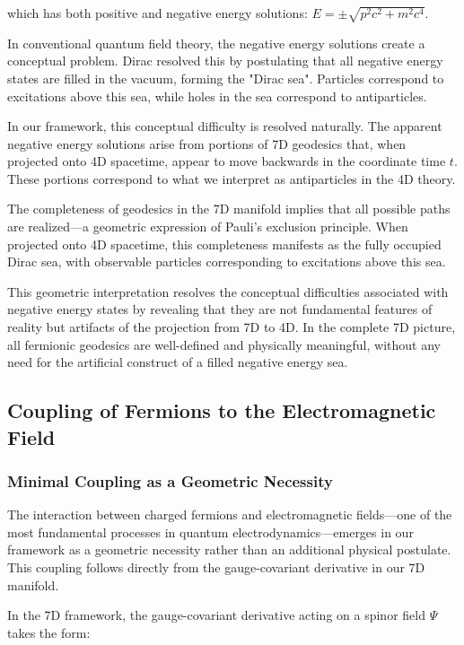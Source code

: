 \documentclass{article}
\begin{document}
which has both positive and negative energy solutions: $E = \pm\sqrt{p^2c^2 + m^2c^4}$.

In conventional quantum field theory, the negative energy solutions create a conceptual problem. Dirac resolved this by postulating that all negative energy states are filled in the vacuum, forming the "Dirac sea". Particles correspond to excitations above this sea, while holes in the sea correspond to antiparticles.

In our framework, this conceptual difficulty is resolved naturally. The apparent negative energy solutions arise from portions of 7D geodesics that, when projected onto 4D spacetime, appear to move backwards in the coordinate time $t$. These portions correspond to what we interpret as antiparticles in the 4D theory.

The completeness of geodesics in the 7D manifold implies that all possible paths are realized—a geometric expression of Pauli's exclusion principle. When projected onto 4D spacetime, this completeness manifests as the fully occupied Dirac sea, with observable particles corresponding to excitations above this sea.

This geometric interpretation resolves the conceptual difficulties associated with negative energy states by revealing that they are not fundamental features of reality but artifacts of the projection from 7D to 4D. In the complete 7D picture, all fermionic geodesics are well-defined and physically meaningful, without any need for the artificial construct of a filled negative energy sea.

\subsection{Coupling of Fermions to the Electromagnetic Field}

\subsubsection{Minimal Coupling as a Geometric Necessity}

The interaction between charged fermions and electromagnetic fields—one of the most fundamental processes in quantum electrodynamics—emerges in our framework as a geometric necessity rather than an additional physical postulate. This coupling follows directly from the gauge-covariant derivative in our 7D manifold.

In the 7D framework, the gauge-covariant derivative acting on a spinor field $\Psi$ takes the form:
\end{document}
